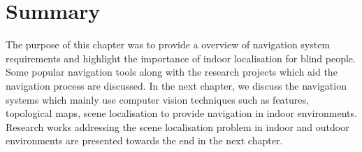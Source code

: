 \section{Summary}
The purpose of this chapter was to provide a 
overview of navigation system requirements 
and highlight the importance of indoor localisation 
for blind people. Some popular navigation tools along 
with the research projects which aid 
the navigation process are discussed. 
In the next chapter, we discuss the navigation
systems which mainly use computer vision 
techniques such as features, topological maps, 
scene localisation to provide navigation in indoor environments.  
Research works addressing the scene localisation 
problem in indoor and outdoor environments
are presented towards the end in the next chapter.





%

